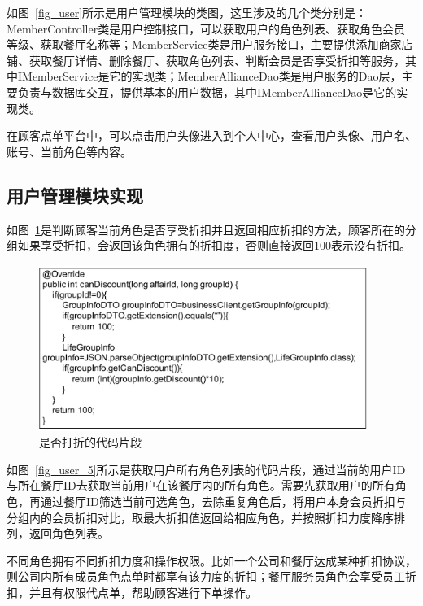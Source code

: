 如图~\ref{fig_user}所示是用户管理模块的类图，这里涉及的几个类分别是：
MemberController类是用户控制接口，可以获取用户的角色列表、获取角色会员等级、获取餐厅名称等；MemberService类是用户服务接口，主要提供添加商家店铺、获取餐厅详情、删除餐厅、获取角色列表、判断会员是否享受折扣等服务，其中IMemberService是它的实现类；MemberAllianceDao类是用户服务的Dao层，主要负责与数据库交互，提供基本的用户数据，其中IMemberAllianceDao是它的实现类。

在顾客点单平台中，可以点击用户头像进入到个人中心，查看用户头像、用户名、账号、当前角色等内容。\\

\subsection{用户管理模块实现}
如图~\ref{fig_user_4}是判断顾客当前角色是否享受折扣并且返回相应折扣的方法，顾客所在的分组如果享受折扣，会返回该角色拥有的折扣度，否则直接返回100表示没有折扣。

\begin{figure}[htbp!]
    \centering
    \includegraphics[width=4.2in]{FIGs/chapter4/4.pdf}
    \caption{是否打折的代码片段}\label{fig_user_4}
\end{figure}

如图~\ref{fig_user_5}所示是获取用户所有角色列表的代码片段，通过当前的用户ID与所在餐厅ID去获取当前用户在该餐厅内的所有角色。需要先获取用户的所有角色，再通过餐厅ID筛选当前可选角色，去除重复角色后，将用户本身会员折扣与分组内的会员折扣对比，取最大折扣值返回给相应角色，并按照折扣力度降序排列，返回角色列表。

不同角色拥有不同折扣力度和操作权限。比如一个公司和餐厅达成某种折扣协议，则公司内所有成员角色点单时都享有该力度的折扣；餐厅服务员角色会享受员工折扣，并且有权限代点单，帮助顾客进行下单操作。

